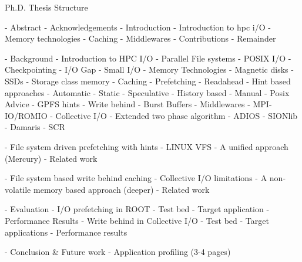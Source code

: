 Ph.D. Thesis Structure

- Abstract
- Acknowledgements 
- Introduction
  - Introduction to hpc i/O
  - Memory technologies
  - Caching
  - Middlewares
  - Contributions
  - Remainder

- Background
  - Introduction to HPC I/O
  - Parallel File systems
    - POSIX I/O
  - Checkpointing
  - I/O Gap
  - Small I/O
  - Memory Technologies
  - Magnetic disks
  - SSDs
  - Storage class memory
  - Caching
    - Prefetching
      - Readahead
      - Hint based approaches
    - Automatic
      - Static
      - Speculative
    - History based
    - Manual
      - Posix Advice
      - GPFS hints
  - Write behind
    - Burst Buffers
    - Middlewares
      - MPI-IO/ROMIO
        - Collective I/O
          - Extended two phase algorithm
      - ADIOS
      - SIONlib
      - Damaris
      - SCR

- File system driven prefetching with hints
  - LINUX VFS
  - A unified approach (Mercury)
  - Related work

- File system based write behind caching
  - Collective I/O limitations
  - A non-volatile memory based approach (deeper)
  - Related work

- Evaluation
  - I/O prefetching in ROOT
    - Test bed
    - Target application
    - Performance Results
  - Write behind in Collective I/O
    - Test bed
    - Target applications
    - Performance results

- Conclusion & Future work
  - Application profiling (3-4 pages)
